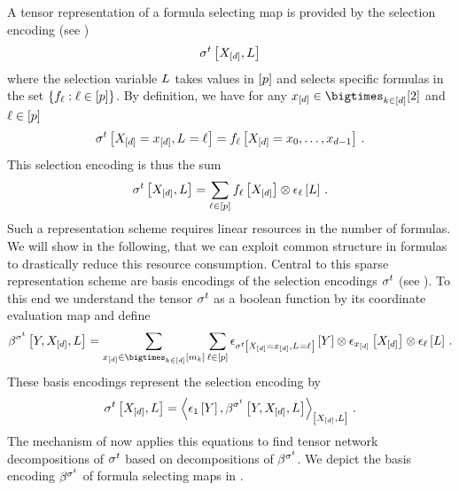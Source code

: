 A tensor representation of a formula selecting map is provided by the selection encoding (see )
\begin{align*}
    \sigma^{t}\left[X_{[d]},L\right]
\end{align*}
where the selection variable $L$ takes values in $[p]$ and selects specific formulas in the set $\{f_{\ell} : \ell\in[p]\}$.
By definition, we have for any $\shortcatindices\in\atomstates$ and $\ell\in[p]$
\begin{align*}
    \sigma^{t}\left[X_{[d]}=x_{[d]},L_{}=\ell_{}\right]
    =  f_{\ell}\left[X_{[d]}={x_{0},\ldots,x_{d-1}}\right] \, .
\end{align*}
This selection encoding is thus the sum
\begin{align*}
    \sigma^{t}\left[X_{[d]},L\right]
    = \sum_{\ell\in[p]} f_{\ell}\left[X_{[d]}\right]
    \otimes \epsilon_{\ell}\left[L\right] \, .
\end{align*}
Such a representation scheme requires linear resources in the number of formulas.
We will show in the following, that we can exploit common structure in formulas to drastically reduce this resource consumption.
Central to this sparse representation scheme are basis encodings of the selection encodings $\sigma^{t}$ (see ).
To this end we understand the tensor $\sigma^{t}$ as a boolean function by its coordinate evaluation map and define
\begin{align*}
    \bsencodingofat{\fselectionmap}{\headvariable,\shortcatvariables,\selvariable}
    = \sum_{\shortcatindicesin}\sum_{\selindexin} \onehotmapofat{\sencodingofat{\fselectionmap}{\indexedshortcatvariables,\indexedselvariable}}{\headvariable} \otimes \onehotmapofat{\shortcatindices}{\shortcatvariables}  \otimes \onehotmapofat{\selindex}{\selvariable} \, .
\end{align*}
These basis encodings represent the selection encoding by
\begin{align*}
    \sencfselectionmapat{\shortcatvariables,\selvariable}
    = \contractionof{\tbasisat{\headvariable},\bsencodingofat{\fselectionmap}{\headvariable,\shortcatvariables,\selvariable}}{\shortcatvariables,\selvariable} \, .
\end{align*}
The mechanism of {\em \selectionSparsity{}} now applies this equations to find tensor network decompositions of $\sigma^{t}$ based on decompositions of $\beta^{\sigma^{t}}$.
We depict the basis encoding $\beta^{\sigma^{t}}$ of formula selecting maps in .




